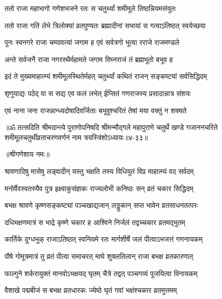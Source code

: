 \twolineshloka
{ततो राजा महाभागो गणेशभजने रतः}
{स चतुर्थ्यां शमीमूले तिष्ठन्नियमसंयुतः} %

\twolineshloka
{ततो राजा गतिं लेभे त्रिलोक्यां व्रतपुण्यतः}
{ब्रह्मादीनां सभायां स गत्वाऽतिष्ठत् स्वयेच्छया} %

\twolineshloka
{पुनः स्वनगरे राजा चम्पावत्यां जगाम ह}
{एवं सर्वत्रगो भूत्वा रराजे राजमण्डले} %

\twolineshloka
{अन्ते सर्वजनै राजा नगरस्थैर्महामते}
{जगाम विघ्नराजं तं ब्रह्मभूतो बभूव ह} %

\twolineshloka
{इदं ते मुख्यमाहात्म्यं शमीमूलस्थितेर्महत्}
{चतुर्थ्यां कथितं राजन् सङ्कष्ट्यां सर्वसिद्धिदम्} %

\twolineshloka
{श‍ृणुयाद्यः पठेद् वा स सद्य एव फलं लभेत्}
{ईप्सितं गणराजस्य प्रसादान्नात्र संशयः} %

\twolineshloka
{एवं नाना जना राजन्नान्ध्यदोषादिवर्जिताः}
{बभूवुश्चरितं तेषां मया वक्तुं न शक्यते} %

॥ॐ तत्सदिति श्रीमदान्त्ये पुराणोपनिषदि श्रीमन्मौद्गले महापुराणे चतुर्थे खण्डे गजाननचरिते शमीमूलचतुर्थीव्रताचरणवर्णनं नाम त्रयस्त्रिंशोऽध्यायः॥४-३३॥


\label{sec:vasishtha-dasharatha-samvada-samapti-varnanam}

\centerline{॥श्रीगणेशाय नमः॥}


\twolineshloka
{श्रावणादिषु मासेषु लड्वादीन् यस्तु भक्षति}
{तस्य विधियुतं विप्र माहात्म्यं वद सर्वदम्} %


\twolineshloka
{मनोर्वैवस्वतस्यैव पुत्र इक्ष्वाकुसंज्ञकः}
{राज्यलोभी कनिष्ठः सन् व्रतं चकार सिद्धिदम्} %

\twolineshloka
{बभक्ष श्रावणे कृष्णसङ्कष्ट्यां पञ्चखाद्यजान्}
{लड्डुकान् सप्त भावेन व्रतसाधनतत्परः} %

\twolineshloka
{दधिभक्षणमात्रं स भाद्रे कृष्णे चकार ह}
{आश्विने निर्जलं तद्वच्चकार व्रतमद्भुतम्} %

\twolineshloka
{कार्तिके दुग्धभुक् राजाऽतिष्ठत् स्वनियमे रतः}
{मार्गशीर्षे जलं पीत्वाऽभजत्तं गणनायकम्} %

\twolineshloka
{पौषे गोमूत्रमात्रं तु व्रतं पीत्वा समाचरत्}
{माघे शुक्लतिलान् राजा बभक्ष व्रतकारणात्} %

\twolineshloka
{फाल्गुने शर्करायुक्तं मानवोऽभक्षयद् घृतम्}
{चैत्रे तद्वत् पञ्चगव्यं पूजयित्वा विनायकम्} %

\twolineshloka
{वैशाखे पद्मबीजं स बभक्ष व्रतधारकः}
{ज्येष्ठे घृतं गवां भक्षंश्चकार व्रतमुत्तमम्} %

